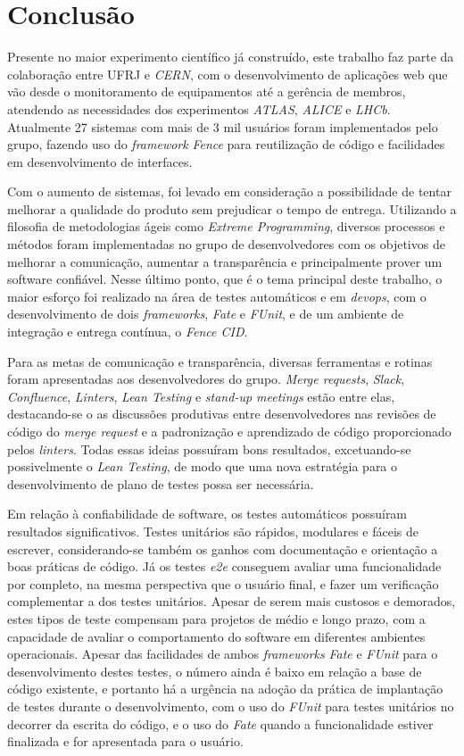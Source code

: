 \chapter{Conclusão}\label{cap_conclusao}

Presente no maior experimento científico já construído, este trabalho faz parte da colaboração entre UFRJ e \emph{CERN}, com o desenvolvimento de aplicações web que vão desde o monitoramento de equipamentos até a gerência de membros, atendendo as necessidades dos experimentos \emph{ATLAS}, \emph{ALICE} e \emph{LHCb}. Atualmente 27 sistemas com mais de 3 mil usuários foram implementados pelo grupo, fazendo uso do \emph{framework} \emph{Fence} para reutilização de código e facilidades em desenvolvimento de interfaces.

Com o aumento de sistemas, foi levado em consideração a possibilidade de tentar melhorar a qualidade do produto sem prejudicar o tempo de entrega. Utilizando a filosofia de metodologias ágeis como \emph{Extreme Programming}, diversos processos e métodos foram implementadas no grupo de desenvolvedores com os objetivos de melhorar a comunicação, aumentar a transparência e principalmente prover um software confiável. Nesse último ponto, que é o tema principal deste trabalho, o maior esforço foi realizado na área de testes automáticos e em \emph{devops}, com o desenvolvimento de dois \emph{frameworks}, \emph{Fate} e \emph{FUnit}, e de um ambiente de integração e entrega contínua, o \emph{Fence CID}.

Para as metas de comunicação e transparência, diversas ferramentas e rotinas foram apresentadas aos desenvolvedores do grupo. \emph{Merge requests}, \emph{Slack}, \emph{Confluence}, \emph{Linters}, \emph{Lean Testing} e \emph{stand-up meetings} estão entre elas, destacando-se o as discussões produtivas entre desenvolvedores nas revisões de código do \emph{merge request} e a padronização e aprendizado de código proporcionado pelos \emph{linters}. Todas essas ideias possuíram bons resultados, excetuando-se possivelmente o \emph{Lean Testing}, de modo que uma nova estratégia para o desenvolvimento de plano de testes possa ser necessária.

Em relação à confiabilidade de software, os testes automáticos possuíram resultados significativos. Testes unitários são rápidos, modulares e fáceis de escrever, considerando-se também os ganhos com documentação e orientação a boas práticas de código. Já os testes \emph{e2e} conseguem avaliar uma funcionalidade por completo, na mesma perspectiva que o usuário final, e fazer um verificação complementar a dos testes unitários. Apesar de serem mais custosos e demorados, estes tipos de teste compensam para projetos de médio e longo prazo, com a capacidade de avaliar o comportamento do software em diferentes ambientes operacionais. Apesar das facilidades de ambos \emph{frameworks} \emph{Fate} e \emph{FUnit} para o desenvolvimento destes testes, o número ainda é baixo em relação a base de código existente, e portanto há a urgência na adoção da prática de implantação de testes durante o desenvolvimento, com o uso do \emph{FUnit} para testes unitários no decorrer da escrita do código, e o uso do \emph{Fate} quando a funcionalidade estiver finalizada e for apresentada para o usuário.

